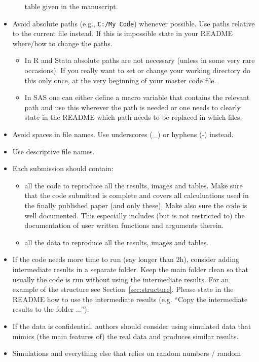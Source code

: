 \documentclass[12pt,a4paper]{article}
\begin{document}
\begin{itemize}
\begin{itemize}
    table given in the manuscript.
  \end{itemize}
\item Avoid absolute paths (e.g., \verb+C:/My Code+) whenever possible. Use
  paths relative to the current file instead. If this is impossible state in
  your README where/how to change the paths.
  \begin{itemize}
  \item In \textsf{R} and \textsf{Stata} absolute paths are not necessary
    (unless in some very rare occasions). If you really want to set or change
    your working directory do this only once, at the very beginning of your
    master code file.
  \item In \textsf{SAS} one can either define a macro variable that contains the
    relevant path and use this wherever the path is needed or one needs to
    clearly state in the README which path needs to be replaced in which files.
  \end{itemize}
\item Avoid spaces in file names. Use underscores (\_) or hyphens (-) instead.
\item Use descriptive file names.
\item Each submission {should} contain:
\begin{itemize}
\item all the code to reproduce all the results, images and tables. Make sure
  that the code submitted is complete and covers all calculuations used in the
  finally published paper (and only these). Make also sure the code is well
  documented. This especially includes (but is not restricted to) the
  documentation of user written functions and arguments therein.
\item all the data to reproduce all the results, images and tables.
\end{itemize}
\item If the code needs more time to run (say longer than 2h), consider adding
  intermediate results in a separate folder. Keep the main folder clean so that
  usually the code is run without using the intermediate results. For an example
  of the structure see Section~\ref{sec:structure}. Please state in the README
  how to use the intermediate results (e.g. ``Copy the intermediate results to
  the folder ...'').
\item If the data is confidential, authors should consider using simulated data
  that mimics (the main features of) the real data and produces similar results.
\item Simulations and everything else that relies on random numbers / random

\end{itemize}
\end{document}
